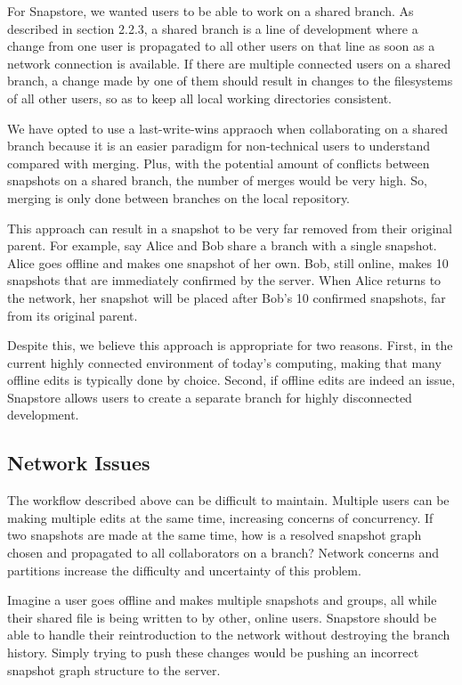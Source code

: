 For Snapstore, we wanted users to be able to work on a shared branch. As described in section 2.2.3, a shared branch is a line of development where a change from one user is propagated to all other users on that line as soon as a network connection is available. If there are multiple connected users on a shared branch, a change made by one of them should result in changes to the filesystems of all other users, so as to keep all local working directories consistent.

We have opted to use a last-write-wins appraoch when collaborating on a shared branch because it is an easier paradigm for non-technical users to understand compared with merging. Plus, with the potential amount of conflicts between snapshots on a shared branch, the number of merges would be very high. So, merging is only done between branches on the local repository.

This approach can result in a snapshot to be very far removed from their original parent. For example, say Alice and Bob share a branch with a single snapshot. Alice goes offline and makes one snapshot of her own. Bob, still online, makes 10 snapshots that are immediately confirmed by the server. When Alice returns to the network, her snapshot will be placed after Bob's 10 confirmed snapshots, far from its original parent.

Despite this, we believe this approach is appropriate for two reasons. First, in the current highly connected environment of today's computing, making that many offline edits is typically done by choice. Second, if offline edits are indeed an issue, Snapstore allows users to create a separate branch for highly disconnected development. 

\subsection{Network Issues}

The workflow described above can be difficult to maintain. Multiple users can be making multiple edits at the same time, increasing concerns of concurrency. If two snapshots are made at the same time, how is a resolved snapshot graph chosen and propagated to all collaborators on a branch? Network concerns and partitions increase the difficulty and uncertainty of this problem. 

Imagine a user goes offline and makes multiple snapshots and groups, all while their shared file is being written to by other, online users. Snapstore should be able to handle their reintroduction to the network without destroying the branch history. Simply trying to push these changes would be pushing an incorrect snapshot graph structure to the server. 


